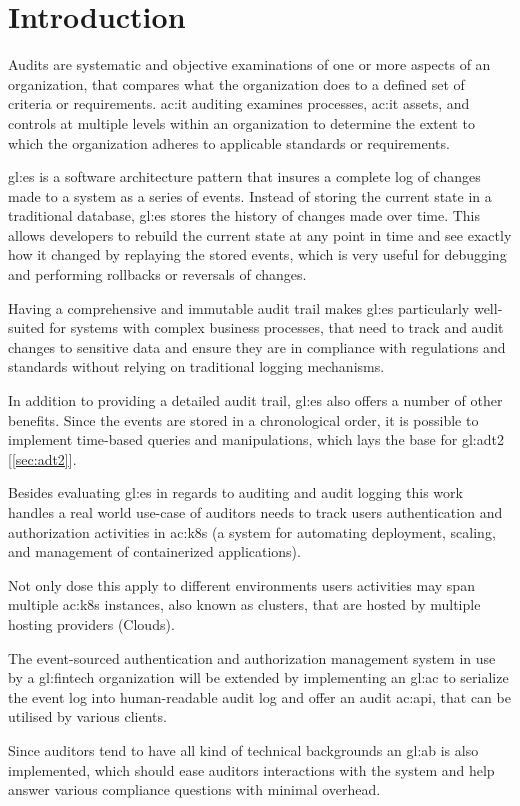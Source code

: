%
\chapter{Introduction}

Audits are systematic and objective examinations of one or more aspects of an organization, that compares what the organization does to a defined set of criteria or requirements. \gls{ac:it} auditing examines processes, \gls{ac:it} assets, and controls at multiple levels within an organization to determine the extent to which the organization adheres to applicable standards or requirements. 

\gls{gl:es} is a software architecture pattern that insures a complete log of changes made to a system as a series of events. Instead of storing the current state in a traditional database, \gls{gl:es} stores the history of changes made over time. This allows developers to rebuild the current state at any point in time and see exactly how it changed by replaying the stored events, which is very useful for debugging and performing rollbacks or reversals of changes.

Having a comprehensive and immutable audit trail makes \gls{gl:es} particularly well-suited for systems with complex business processes, that need to track and audit changes to sensitive data and ensure they are in compliance with regulations and standards without relying on traditional logging mechanisms.

In addition to providing a detailed audit trail, \gls{gl:es} also offers a number of other benefits. Since the events are stored in a chronological order, it is possible to implement time-based queries and manipulations, which lays the base for \gls{gl:adt2} [\ref{sec:adt2}].

Besides evaluating \gls{gl:es} in regards to auditing and audit logging 
this work handles a real world use-case of auditors needs to track users authentication and authorization activities in \gls{ac:k8s} (a system for automating deployment, scaling, and management of containerized applications).

Not only dose this apply to different environments users activities may span multiple \gls{ac:k8s} instances, also known as clusters, that are hosted by multiple hosting providers (Clouds).

The event-sourced authentication and authorization management system in use by a \gls{gl:fintech} organization will be extended by implementing an \gls{gl:ac} to serialize the event log into human-readable audit log and offer an audit \gls{ac:api}, that can be utilised by various clients.

Since auditors tend to have all kind of technical backgrounds an \gls{gl:ab} is also implemented, which should ease auditors interactions with the system and help answer various compliance questions with minimal overhead.